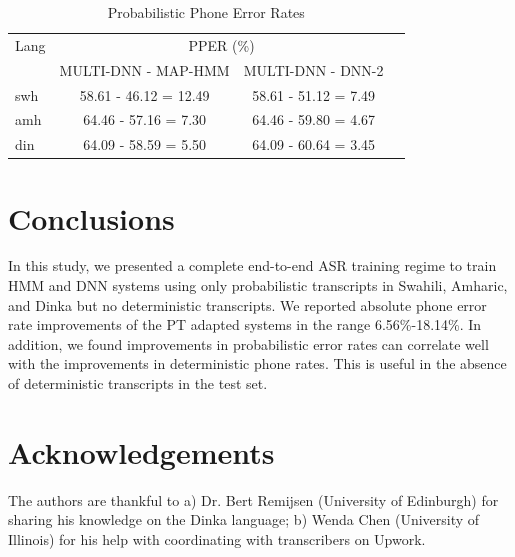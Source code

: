 \documentclass[a4paper]{article}
\newcommand{\myvspacesec}{\vspace{-2mm}}
\begin{document}
\begin{table}
\centering %
\begin{tabular}{l|c c c}
   \hline
Lang  & \multicolumn{2}{c}{PPER (\%)} \\
          &  \footnotesize{MULTI-DNN - MAP-HMM} & \footnotesize{MULTI-DNN - DNN-2}  \\ \hline
swh      &  58.61 - 46.12 = 12.49 & 58.61 - 51.12 = 7.49  \\
amh      & 64.46 - 57.16 = 7.30   & 64.46 - 59.80 = 4.67  \\ 
din      & 64.09 - 58.59 = 5.50   & 64.09 - 60.64 = 3.45 \\ \hline
\end{tabular}
\caption{Probabilistic Phone Error Rates} \label{Tab:PPER}
\vspace{-7mm}
\end{table}

\myvspacesec
\section{Conclusions} \vspace{-1mm}
In this study, we presented a complete end-to-end ASR training regime to train HMM and DNN systems using only probabilistic transcripts in Swahili, Amharic, and Dinka but no deterministic transcripts. We reported absolute phone error rate improvements of the PT adapted systems in the range 6.56\%-18.14\%. In addition, we found improvements in probabilistic error rates can correlate well with the improvements in deterministic phone rates. This is useful in the absence of deterministic transcripts in the test set.

\myvspacesec
\vspace{-2mm}
\section{Acknowledgements} \vspace{-1mm}
The authors are thankful to a) Dr. Bert Remijsen (University of Edinburgh) for sharing his knowledge on the Dinka language; b) Wenda Chen (University of Illinois) for his help with coordinating with transcribers on Upwork.

\end{document}
